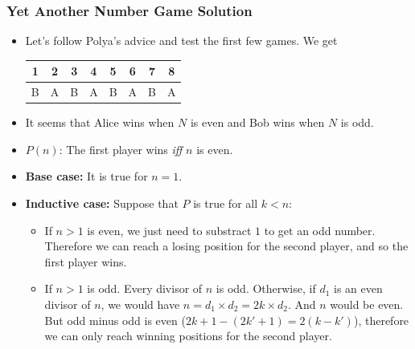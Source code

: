 \documentclass{beamer}
\begin{document}
\begin{frame}%
\frametitle{Yet Another Number Game Solution}
\scriptsize

\begin{itemize}

\item Let's follow Polya's advice and test the first few games. We get\\
\begin{center}
\begin{tabular}{|c|c|c|c|c|c|c|c|}
\hline
1 & 2 & 3 & 4 & 5 & 6 & 7 & 8\\
\hline
B & A & B & A & B & A & B & A\\
\hline
\end{tabular}
\end{center}

\item<2-> It seems that Alice wins when $N$ is even and Bob wins when $N$ is odd.

\vspace{0.2cm}

\item<3-> $P(n)$: The first player wins \emph{iff} $n$ is even.

\vspace{0.2cm}

\item<4-> \textbf{Base case:} It is true for $n = 1$.

\vspace{0.2cm}

\item<5-> \textbf{Inductive case:} Suppose that $P$ is true for all $k < n$:

\begin{itemize}
\scriptsize

\item<5-> If $n > 1$ is even, we just need to substract $1$ to get an odd number. Therefore we can reach
a losing position for the second player, and so the first player wins.

\vspace{0.1cm}

\item<6-> If $n > 1$ is odd. Every divisor of $n$ is odd.
Otherwise, if $d_1$ is an even divisor of $n$, we would have $n = d_1 \times d_2 = 2k \times d_2$. And $n$ would be even.\\
But odd minus odd is even ($2k + 1 - (2k' + 1) = 2(k - k')$), therefore we can only reach winning positions for the second player.
\end{itemize}

\end{itemize}

\end{frame}
\end{document}
